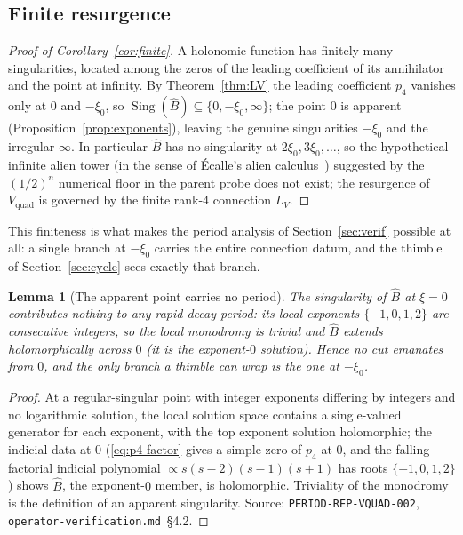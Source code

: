\documentclass[11pt,reqno]{amsart}
\theoremstyle{plain}
\newtheorem{lemma}[theorem]{Lemma}
\theoremstyle{definition}
\newcommand{\Vquad}{V_{\mathrm{quad}}}
\newcommand{\Bhat}{\widehat{B}}
\newcommand{\LV}{L_{V}}
\newcommand{\xizero}{\xi_0}
\begin{document}
\subsection{Finite resurgence}
\begin{proof}[Proof of Corollary~\ref{cor:finite}]
A holonomic function has finitely many singularities, located among the zeros of the leading
coefficient of its annihilator and the point at infinity. By Theorem~\ref{thm:LV} the leading
coefficient $p_4$ vanishes only at $0$ and $-\xizero$, so
$\operatorname{Sing}(\Bhat)\subseteq\{0,-\xizero,\infty\}$; the point $0$ is apparent
(Proposition~\ref{prop:exponents}), leaving the genuine singularities $-\xizero$ and the
irregular $\infty$. In particular $\Bhat$ has no singularity at $2\xizero,3\xizero,\dots$, so the
hypothetical infinite alien tower (in the sense of \'Ecalle's alien calculus~\cite{Ecalle})
suggested by the $(1/2)^n$ numerical floor in the parent probe
does not exist; the resurgence of $\Vquad$ is governed by the finite rank-$4$ connection $\LV$.
\end{proof}

This finiteness is what makes the period analysis of Section~\ref{sec:verif} possible at all: a
single branch at $-\xizero$ carries the entire connection datum, and the thimble of
Section~\ref{sec:cycle} sees exactly that branch.

\begin{lemma}[The apparent point carries no period]\label{lem:apparent}
The singularity of $\Bhat$ at $\xi=0$ contributes nothing to any rapid-decay period: its local
exponents $\{-1,0,1,2\}$ are consecutive integers, so the local monodromy is trivial and $\Bhat$
extends holomorphically across $0$ (it is the exponent-$0$ solution). Hence no cut emanates from
$0$, and the only branch a thimble can wrap is the one at $-\xizero$.
\end{lemma}

\begin{proof}
At a regular-singular point with integer exponents differing by integers and no logarithmic
solution, the local solution space contains a single-valued generator for each exponent, with the
top exponent solution holomorphic; the indicial data at $0$
(\eqref{eq:p4-factor} gives a simple zero of $p_4$ at $0$, and the falling-factorial indicial
polynomial $\propto s(s-2)(s-1)(s+1)$ has roots $\{-1,0,1,2\}$) shows $\Bhat$, the exponent-$0$
member, is holomorphic. Triviality of the monodromy is the definition of an apparent singularity.
Source: \texttt{PERIOD-REP-VQUAD-002}, \texttt{operator-verification.md}~\S4.2.
\end{proof}
\end{document}
